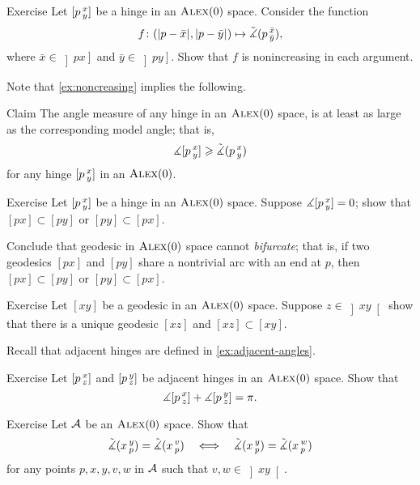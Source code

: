 \begin{thm}{Exercise}\label{ex:noncreasing}
Let $[p\,{}^{x}_{y}]$ be a hinge in an $\textsc{Alex}(0)$ space.
Consider the function
\[f\colon(|{p}-{\bar x}|_{}^{{}},|{p}-{\bar y}|_{}^{{}})\mapsto \tilde\measuredangle(p\,{}^{\bar x}_{\bar y}),\]
where $\bar x\in\left]p x\right]$ and $\bar y\in\left]p y\right]$.
Show that $f$ is nonincreasing in each argument.
\end{thm}

Note that \ref{ex:noncreasing} implies the following.

\begin{thm}{Claim}\label{clm:angle-defined}
The angle measure of any hinge in an $\textsc{Alex}(0)$ 
space, is at least as large as the corresponding model angle;
that is,
\[\measuredangle[p\,{}^{x}_{y}]\geqslant \tilde\measuredangle(p\,{}^{x}_{y})\]
for any hinge $[p\,{}^{x}_{y}]$ in an $\textsc{Alex}(0)$.

\end{thm}

\begin{thm}{Exercise}\label{ex:0-angle}
Let $[p\,{}^{x}_{y}]$ be a hinge in an $\textsc{Alex}(0)$ space.
Suppose $\measuredangle[p\,{}^{x}_{y}]=0$; show that $[px]\subset [py]$ or $[py]\subset [px]$.

Conclude that geodesic in $\textsc{Alex}(0)$ space cannot \emph{bifurcate};
that is, if two geodesics $[px]$ and $[py]$ share a nontrivial arc with an end at $p$, then $[px]\subset [py]$ or $[py]\subset [px]$.
\end{thm}

\begin{thm}{Exercise}\label{ex:pi-angle}
Let $[xy]$ be a geodesic in an $\textsc{Alex}(0)$ space.
Suppose $z\in \left]xy\right[$ show that there is a unique geodesic $[xz]$ and $[xz]\subset [xy]$.
\end{thm}

Recall that adjacent hinges are defined in \ref{ex:adjacent-angles}.

\begin{thm}{Exercise}\label{ex:adjacent-CBB}
Let $[p\,{}^{x}_{z}]$ and $[p\,{}^{y}_{z}]$ be adjacent hinges in an $\textsc{Alex}(0)$ 
space.
Show that
\[\measuredangle[p\,{}^{x}_{z}]+\measuredangle[p\,{}^{y}_{z}]= \pi.\]
\end{thm}


\begin{thm}{Exercise}\label{ex:pxyvw}
Let $\mathcal{A}$ be an $\textsc{Alex}(0)$ 
space.
Show that  
\[
\tilde\measuredangle(x\,{}^{y}_{p})=\tilde\measuredangle(x\,{}^{v}_{p})
\quad\Longleftrightarrow\quad
\tilde\measuredangle(x\,{}^{y}_{p})=\tilde\measuredangle(x\,{}^{w}_{p})
\]
for any points
$p,x,y,v,w$ in $\mathcal{A}$ such that $v,w\in \left]xy\right[$.
\end{thm}


